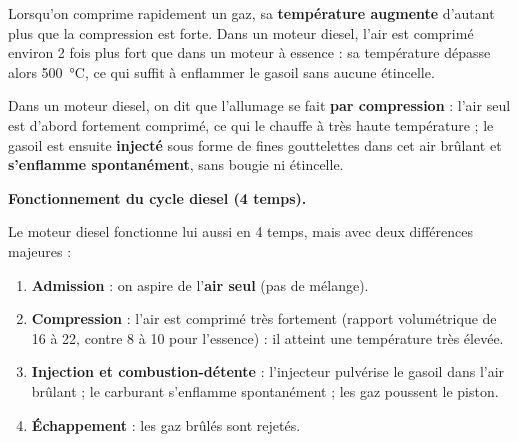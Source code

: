 \documentclass[11pt]{article}
\newcommand{\cle}[1]{{\popxbold\color{popdark}#1}}
\begin{document}
\begin{propriete}
Lorsqu'on comprime rapidement un gaz, sa \textbf{température augmente} d'autant plus que la compression est forte. Dans un moteur diesel, l'air est comprimé environ 2 fois plus fort que dans un moteur à essence : sa température dépasse alors \SI{500}{\celsius}, ce qui suffit à enflammer le gasoil sans aucune étincelle.
\end{propriete}

\begin{definition}
Dans un \cle{moteur diesel}, on dit que l'allumage se fait \textbf{par compression} : l'air seul est d'abord fortement comprimé, ce qui le chauffe à très haute température ; le gasoil est ensuite \textbf{injecté} sous forme de fines gouttelettes dans cet air brûlant et \textbf{s'enflamme spontanément}, sans bougie ni étincelle.
\end{definition}

\textbf{Fonctionnement du cycle diesel (4 temps).}\par
Le moteur diesel fonctionne lui aussi en 4 temps, mais avec deux différences majeures :
\begin{enumerate}
\item \textbf{Admission} : on aspire de l'\textbf{air seul} (pas de mélange).
\item \textbf{Compression} : l'air est comprimé très fortement (rapport volumétrique de 16 à 22, contre 8 à 10 pour l'essence) : il atteint une température très élevée.
\item \textbf{Injection et combustion-détente} : l'\cle{injecteur} pulvérise le gasoil dans l'air brûlant ; le carburant s'enflamme spontanément ; les gaz poussent le piston.
\item \textbf{Échappement} : les gaz brûlés sont rejetés.
\end{enumerate}
\end{document}
